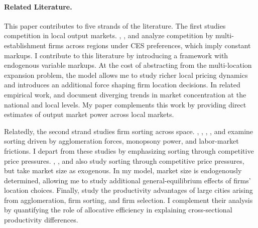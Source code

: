 \paragraph{Related Literature.} This paper contributes to five strands of the literature. The first studies competition in local output markets. \textcite{Hsieh&RossiHansberg23}, \textcite{Oberfieldetal23}, and \textcite{Kleinman25} analyze competition by multi-establishment firms across regions under CES preferences, which imply constant markups. I contribute to this literature by introducing a framework with endogenous variable markups. At the cost of abstracting from the multi-location expansion problem, the model allows me to study richer local pricing dynamics and introduces an additional force shaping firm location decisions. In related empirical work, \textcite{RossiHansbergSarte&Trachter20} and \textcite{AutorPaterson&VanReenen23} document diverging trends in market concentration at the national and local levels. My paper complements this work by providing direct estimates of output market power across local markets.

Relatedly, the second strand studies firm sorting across space. \textcite{Gaubert18}, \textcite{Bilal23}, \textcite{oh2023spatial}, \textcite{lindenlaub2024spatial}, and \textcite{lhuillier2025local} examine sorting driven by agglomeration forces, monopsony power, and labor-market frictions. I depart from these studies by emphasizing sorting through competitive price pressures. \textcite{Nocke06}, \textcite{Combesetal12}, and \textcite{Matsuyama&Ushev22} also study sorting through competitive price pressures, but take market size as exogenous. In my model, market size is endogenously determined, allowing me to study additional general-equilibrium effects of firms’ location choices. Finally, \textcite{BehrensDuranton&RobertNicoud14} study the productivity advantages of large cities arising from agglomeration, firm sorting, and firm selection. I complement their analysis by quantifying the role of allocative efficiency in explaining cross-sectional productivity differences.


